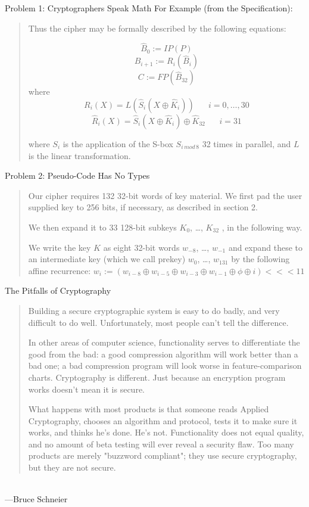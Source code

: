 \documentclass[style=sailor]{powerdot}
\begin{document}
\begin{slide}{Problem 1: Cryptographers Speak Math}
\pause
For Example (from the Specification):\\

\blockquote{
Thus the cipher may be formally described by the following equations:

$$\hat B_0 := IP(P)$$\pause
$$B_{i+1} := R_i(\hat B_i)$$\pause
$$C := FP(\hat B_32)$$\pause
where
$$R_i (X) = L(\hat S_i (X \oplus \hat K_i )) \hspace{20pt}  i = 0, \ldots , 30$$\pause
$$ \hat R_i (X) =  \hat S_i (X \oplus \hat K_i ) \oplus \hat K_{32} \hspace{20pt} i = 31$$\pause

where $S_i$ is the application of the S-box $S_{i\hspace{2pt} mod \hspace{2pt} 8}$ 32 times in parallel, and $L$ is the linear transformation.
}\cite[3]{submission}
\end{slide}

\begin{slide}{Problem 2: Pseudo-Code Has No Types}
\pause
\blockquote{Our cipher requires 132 32-bit words of key material. We first pad the user supplied key to 256 bits, if necessary, as described in section 2. \pause
\medskip

We then expand it to 33 128-bit subkeys $K_0$, \ldots, $K_{32}$ , in the following way. \pause
\medskip

We write the key $K$ as eight 32-bit words $w_{-8}$, \ldots, $w_{-1}$ and expand these to an intermediate key (which we call prekey) $w_0$, \ldots, $w_{131}$ by the following affine recurrence:
$w_i := (w_{i-8} \oplus w_{i-5} \oplus w_{i-3} \oplus w_{i-1} \oplus \phi \oplus i) <<< 11$}\cite[7]{submission}
\end{slide}

\begin{slide}[toc=]{The Pitfalls of Cryptography}
\pause
\blockquote{Building a secure cryptographic system is easy to do badly, and very difficult to do well. Unfortunately, most people can't tell the difference. \pause
\medskip

In other areas of computer science, functionality serves to differentiate the good from the bad: a good compression algorithm will work better than a bad one; a bad compression program will look worse in feature-comparison charts. Cryptography is different. Just because an encryption program works doesn't mean it is secure.\pause
\medskip

What happens with most products is that someone reads Applied Cryptography, chooses an algorithm and protocol, tests it to make sure it works, and thinks he's done. He's not. Functionality does not equal quality, and no amount of beta testing will ever reveal a security flaw. Too many products are merely "buzzword compliant"; they use secure cryptography, but they are not secure.}  \\---Bruce Schneier \cite{Schneier:Pitfalls}
\end{slide}
\end{document}
